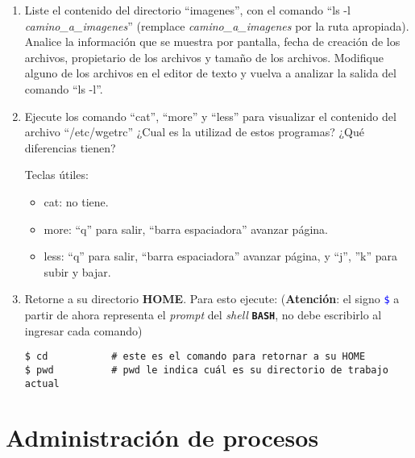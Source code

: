 \documentclass[12pt]{article}
\newcommand{\cw}[1]{\mbox{\texttt{\textcolor{blue}{#1}}}}
\newcommand{\bash}{\textbf{\texttt{BASH}}}
\begin{document}
\begin{enumerate}[resume]
    \item Liste el contenido del directorio ``imagenes'', con el comando ``ls
        -l \emph{camino\_a\_imagenes}'' (remplace \emph{camino\_a\_imagenes}
        por la ruta apropiada). Analice la información que se muestra por
        pantalla, fecha de creación de los archivos, propietario de los
        archivos y tamaño de los archivos. Modifique alguno de los archivos en
        el editor de texto y vuelva a analizar la salida del comando ``ls
        -l''.

    \item Ejecute los comando ``cat'', ``more'' y ``less'' para visualizar el
        contenido del archivo ``/etc/wgetrc'' ¿Cual es la utilizad de estos
        programas? ¿Qué diferencias tienen?

    Teclas útiles:

    \begin{itemize}

        \itemsep2pt \parskip0pt 

        \item cat: no tiene.

        \item more: ``q'' para salir, ``barra espaciadora'' avanzar página.

        \item less: ``q'' para salir, ``barra espaciadora'' avanzar página, y
            ``j'', ''k'' para subir y bajar.

    \end{itemize}

    \item Retorne a su directorio \textbf{HOME}. Para esto ejecute:
        (\textbf{Atención}: el signo \cw{\$} a partir de ahora representa el
        \emph{prompt} del \emph{shell} \bash, no debe escribirlo al ingresar
        cada comando)

        \begin{verbatim}
$ cd           # este es el comando para retornar a su HOME
$ pwd          # pwd le indica cuál es su directorio de trabajo actual
        \end{verbatim}

\end{enumerate}

\section{Administración de procesos}
\end{document}
